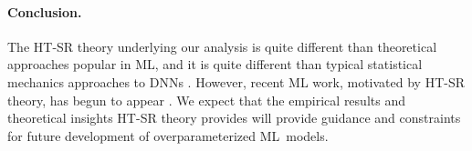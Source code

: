 \documentclass{article}
\newcommand{\charles}[1]{{\color{blue}\sf{[Charles: #1]}}}
\begin{document}



\vspace{-5mm}
\paragraph{Conclusion.}

The HT-SR theory underlying our analysis is quite different than theoretical approaches popular in ML, and it is quite different than typical statistical mechanics approaches to DNNs \cite{BKPx20}.
%
%
However, recent ML work, motivated by HT-SR theory, has begun to appear
\cite{HodMah20A_TR,GSZ20_TR, ZCM20_TR, DLM19_Exact_TR, TKM20_TR, LEHM21_TR,Mah12, DKM20_TR}. 
We expect that the empirical results and theoretical insights HT-SR theory provides will provide guidance and constraints for future development of overparameterized ML~models.





\end{document}
